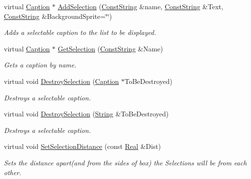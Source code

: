 \begin{DoxyCompactItemize}
virtual \hyperlink{classphys_1_1UI_1_1Caption}{Caption} $\ast$ \hyperlink{classphys_1_1UI_1_1ListBox_aa6069fc3690e09142033886d9d7b0b3a}{AddSelection} (\hyperlink{namespacephys_a5ce5049f8b4bf88d6413c47b504ebb31}{ConstString} \&name, \hyperlink{namespacephys_a5ce5049f8b4bf88d6413c47b504ebb31}{ConstString} \&Text, \hyperlink{namespacephys_a5ce5049f8b4bf88d6413c47b504ebb31}{ConstString} \&BackgroundSprite=\char`\"{}\char`\"{})
\begin{DoxyCompactList}\small\item\em Adds a selectable caption to the list to be displayed. \item\end{DoxyCompactList}\item 
virtual \hyperlink{classphys_1_1UI_1_1Caption}{Caption} $\ast$ \hyperlink{classphys_1_1UI_1_1ListBox_a1a5f9c44430387cc96744411bea9e978}{GetSelection} (\hyperlink{namespacephys_a5ce5049f8b4bf88d6413c47b504ebb31}{ConstString} \&Name)
\begin{DoxyCompactList}\small\item\em Gets a caption by name. \item\end{DoxyCompactList}\item 
virtual void \hyperlink{classphys_1_1UI_1_1ListBox_a295acf830ed17c78a59e5ba871a5a234}{DestroySelection} (\hyperlink{classphys_1_1UI_1_1Caption}{Caption} $\ast$ToBeDestroyed)
\begin{DoxyCompactList}\small\item\em Destroys a selectable caption. \item\end{DoxyCompactList}\item 
virtual void \hyperlink{classphys_1_1UI_1_1ListBox_a3aa3bfaee473b7590692e8707dada68d}{DestroySelection} (\hyperlink{namespacephys_aa03900411993de7fbfec4789bc1d392e}{String} \&ToBeDestroyed)
\begin{DoxyCompactList}\small\item\em Destroys a selectable caption. \item\end{DoxyCompactList}\item 
virtual void \hyperlink{classphys_1_1UI_1_1ListBox_a884c17a0462c95dfcad3f8f6b7671e15}{SetSelectionDistance} (const \hyperlink{namespacephys_af7eb897198d265b8e868f45240230d5f}{Real} \&Dist)
\begin{DoxyCompactList}\small\item\em Sets the distance apart(and from the sides of box) the Selections will be from each other. \item\end{DoxyCompactList}\item 

\end{DoxyCompactItemize}
